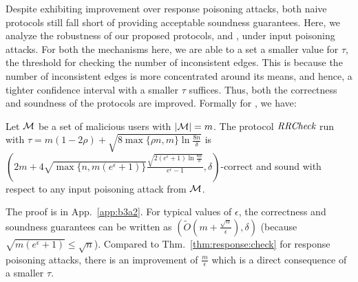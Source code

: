 

Despite exhibiting improvement over response poisoning attacks, both naive protocols still fall short of providing acceptable soundness guarantees. Here, we analyze the robustness of our proposed protocols, \DegRRNaive{} and \DegHybrid{}, under input poisoning attacks. For both the mechanisms here, we are able to a set a smaller value for $\tau$, the threshold for checking the number of inconsistent edges. This is because the number of inconsistent edges is more concentrated around its means, and hence, a tighter confidence interval with a smaller $\tau$ suffices. Thus, both the correctness and soundness of the protocols are improved. Formally for \DegRRNaive{}, we have:

\begin{thm}\label{thm:input:check}
Let $\mathcal{M}$ be a set of malicious users with $|\mathcal{M}| = m$. 
The protocol $\textit{RRCheck}$ run with $\tau = m(1-2\rho) + \sqrt{8 \max\{\rho n, m\} \ln \frac{8n}{\delta}}$ is 
  $(2m+4\sqrt{\max\{n, m(e^\epsilon+1)\}}\frac{\sqrt{2(e^\epsilon+1) \ln \frac{8n}{\delta}}}{e^\epsilon-1}, \delta)$-correct and sound with respect to any input poisoning attack from $\mathcal{M}$.
\end{thm}
The proof is in App.~\ref{app:b3a2}.
For typical values of $\epsilon$, the correctness and soundness guarantees can be written as $(\tilde{O}(m + \frac{\sqrt{n}}{\epsilon}), \delta)$ (because $\sqrt{m(e^\epsilon+1)} \leq \sqrt{n}$). Compared to Thm.~\ref{thm:response:check} for response poisoning attacks, there is an improvement of $\frac{m}{\epsilon}$ which is a direct consequence of a smaller $\tau$. 

